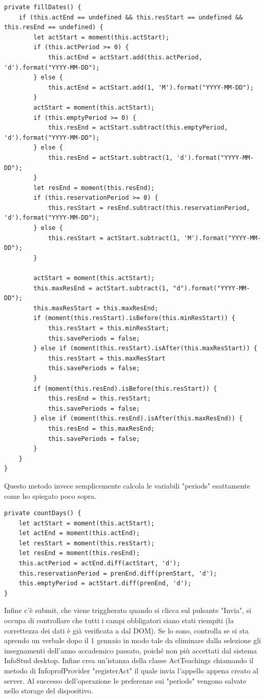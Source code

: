 \documentclass[Lau, oneside]{sapthesis}%
\begin{document}
\begin{lstlisting}[frame=single]
private fillDates() {
	if (this.actEnd == undefined && this.resStart == undefined && this.resEnd == undefined) {
		let actStart = moment(this.actStart);
		if (this.actPeriod >= 0) {
			this.actEnd = actStart.add(this.actPeriod, 'd').format("YYYY-MM-DD");
		} else {
			this.actEnd = actStart.add(1, 'M').format("YYYY-MM-DD");
		}
		actStart = moment(this.actStart);
		if (this.emptyPeriod >= 0) {
			this.resEnd = actStart.subtract(this.emptyPeriod, 'd').format("YYYY-MM-DD");
		} else {
			this.resEnd = actStart.subtract(1, 'd').format("YYYY-MM-DD");
		}
		let resEnd = moment(this.resEnd);
		if (this.reservationPeriod >= 0) {
			this.resStart = resEnd.subtract(this.reservationPeriod, 'd').format("YYYY-MM-DD");
		} else {
			this.resStart = actStart.subtract(1, 'M').format("YYYY-MM-DD");
		}

		actStart = moment(this.actStart);
		this.maxResEnd = actStart.subtract(1, "d").format("YYYY-MM-DD");
		this.maxResStart = this.maxResEnd;
		if (moment(this.resStart).isBefore(this.minResStart)) {
			this.resStart = this.minResStart;
			this.savePeriods = false;
		} else if (moment(this.resStart).isAfter(this.maxResStart)) {
			this.resStart = this.maxResStart
			this.savePeriods = false;
		}
		if (moment(this.resEnd).isBefore(this.resStart)) {
			this.resEnd = this.resStart;
			this.savePeriods = false;
		} else if (moment(this.resEnd).isAfter(this.maxResEnd)) {
			this.resEnd = this.maxResEnd;
			this.savePeriods = false;
		}
	}
}
\end{lstlisting}

Questo metodo invece semplicemente calcola le variabili "periods" esattamente come ho spiegato poco sopra.

\begin{lstlisting}
private countDays() {
	let actStart = moment(this.actStart);
	let actEnd = moment(this.actEnd);
	let resStart = moment(this.resStart);
	let resEnd = moment(this.resEnd);
	this.actPeriod = actEnd.diff(actStart, 'd');
	this.reservationPeriod = prenEnd.diff(prenStart, 'd');
	this.emptyPeriod = actStart.diff(prenEnd, 'd');
}
\end{lstlisting}

Infine c'è submit, che viene triggherato quando si clicca sul pulsante "Invia", si occupa di controllare che tutti i campi obbligatori siano stati riempiti (la correttezza dei dati è già verificata a dal DOM). Se lo sono, controlla se si sta aprendo un verbale dopo il 1 gennaio in modo tale da eliminare dalla selezione gli insegnamenti dell'anno accademico passato, poiché non più accettati dal sistema InfoStud desktop. Infine crea un'istanza della classe ActTeachings chiamando il metodo di InfoprofProvider "registerAct" il quale invia l'appello appena creato al server. Al successo dell'operazione le preferenze sui "periods" vengono salvate nello storage del dispositivo.
\end{document}
